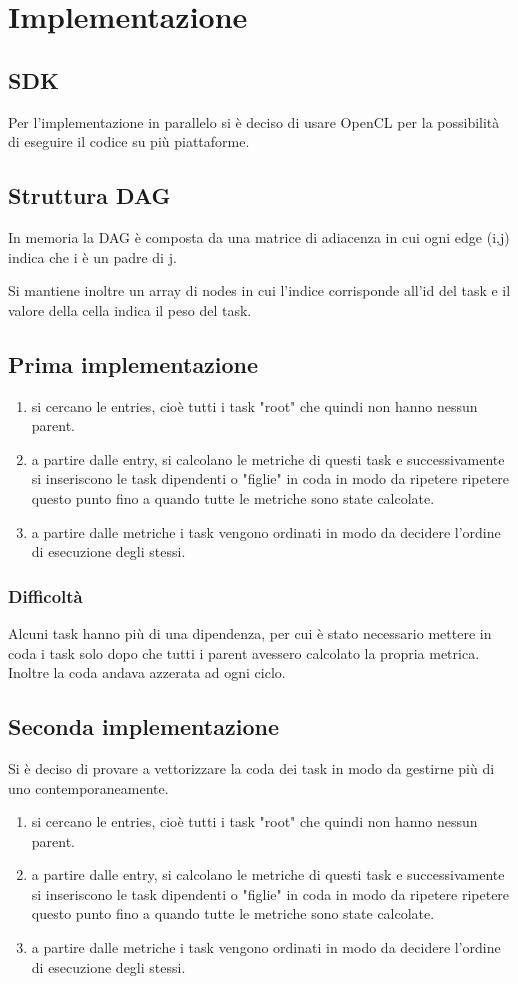 \documentclass[../relazione.tex]{subfiles}
\begin{document}
\section{Implementazione}
\subsection{SDK}
Per l'implementazione in parallelo si è deciso di usare OpenCL per la possibilità di eseguire il codice su più piattaforme.
\subsection{Struttura DAG}
In memoria la DAG è composta da una matrice di adiacenza in cui ogni edge (i,j) indica che i è un padre di j.

Si mantiene inoltre un array di nodes in cui l'indice corrisponde all'id del task e il valore della cella indica il peso del task.

\subsection{Prima implementazione}
\begin{enumerate}
\item  si cercano le entries, cioè tutti i task "root" che quindi non hanno nessun parent.
\item a partire dalle entry, si calcolano le metriche di questi task e successivamente si inseriscono le task dipendenti o "figlie" in coda in modo da ripetere ripetere questo punto fino a quando tutte le metriche sono state calcolate.
\item a partire dalle metriche i task vengono ordinati in modo da decidere l'ordine di esecuzione degli stessi.
\end{enumerate}
\subsubsection{Difficoltà}
Alcuni task hanno più di una dipendenza, per cui è stato necessario mettere in coda i task solo dopo che tutti i parent avessero calcolato la propria metrica.
Inoltre la coda andava azzerata ad ogni ciclo.

\subsection{Seconda implementazione}
Si è deciso di provare a vettorizzare la coda dei task in modo da gestirne più di uno contemporaneamente.
\begin{enumerate}
\item  si cercano le entries, cioè tutti i task "root" che quindi non hanno nessun parent.
\item a partire dalle entry, si calcolano le metriche di questi task e successivamente si inseriscono le task dipendenti o "figlie" in coda in modo da ripetere ripetere questo punto fino a quando tutte le metriche sono state calcolate.
\item a partire dalle metriche i task vengono ordinati in modo da decidere l'ordine di esecuzione degli stessi.
\end{enumerate}
\end{document}
